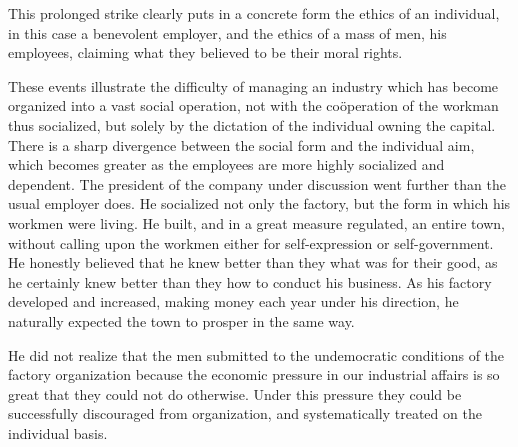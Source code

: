 \documentclass[]{article}
\begin{document}
\begin{sectionbody}
\addamsparagraph This prolonged strike clearly puts in a concrete form the ethics of an
individual, in this case a benevolent employer, and the ethics of a mass
of men, his employees, claiming what they believed to be their moral
rights.

\addamsparagraph These events illustrate the difficulty of managing an industry which has
become organized into a vast social operation, not with the coöperation
of the workman thus socialized, but solely by the dictation of the
individual owning the capital. There is a sharp divergence between the
social form and the individual aim, which becomes greater as the
employees are more highly socialized and dependent. The president of the
company under discussion went further than the usual employer does. He
socialized not only the factory, but the form in which his workmen were
living. He built, and in a great measure regulated, an entire town,
without calling upon the workmen either for self-expression or
self-government. He honestly believed that he knew better than they what
was for their good, as he certainly knew better than they how to conduct
his business. As his factory developed and increased, making money each
year under his direction, he naturally expected the town to prosper in
the same way.

\addamsparagraph He did not realize that the men submitted to the undemocratic conditions
of the factory organization because the economic pressure in our
industrial affairs is so great that they could not do otherwise. Under
this pressure they could be successfully discouraged from organization,
and systematically treated on the individual basis.


\end{sectionbody}
\end{document}
